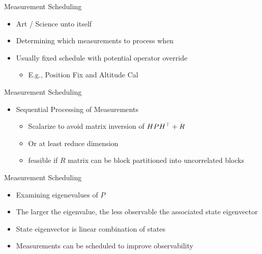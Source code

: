 \begin{frame}
Measurement Scheduling
 \begin{itemize}
 \item Art / Science unto itself
 \item Determining which measurements to process when
 \item Usually fixed schedule with potential operator override
	\begin{itemize}
		\item E.g., Position Fix and Altitude Cal
	\end{itemize}
\end{itemize}
\end{frame}

\begin{frame}
Measurement Scheduling
\begin{itemize}
  \item Sequential Processing of Measurements
	\begin{itemize}
  		\item Scalarize to avoid matrix inversion of $HPH^\top + R$
		\item Or at least reduce dimension
		\item feasible if $R$ matrix can be block partitioned into uncorrelated blocks
	\end{itemize} 
\end{itemize} 
\end{frame}

\begin{frame}
Measurement Scheduling
\begin{itemize}
  \item Examining eigenevalues of $P$
  \item The larger the eigenvalue, the less observable the associated state eigenvector
  \item State eigenvector is linear combination of states
  \item Measurements can be scheduled to improve observability
\end{itemize} 
\end{frame}
